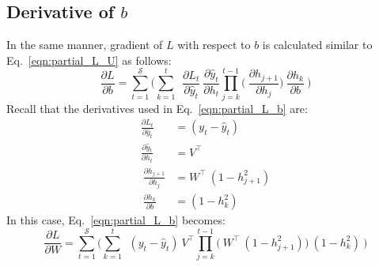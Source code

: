 \documentclass{article}
\begin{document}
\subsection{Derivative of $b$}
In the same manner, gradient of $L$ with respect to $b$ is calculated similar to Eq.~\eqref{eqn:partial_L_U} as follows:
\begin{equation}
	\frac{\partial L}{ \partial{b}} = \sum_{t=1}^{\mathcal{S}} 
	\bigg(	
	 \sum_{k=1}^{t} ~
	~\frac{\partial L_t}{\partial \hat{y}_t}
	~\frac{\partial \hat{y}_t}{\partial h_t}
        \prod_{j=k}^{t-1} \bigg(
	~\frac{\partial h_{j+1}}{\partial h_{j}}
        \bigg)
	~\frac{\partial h_k}{\partial b}~
	\bigg) 
 \label{eqn:partial_L_b}
\end{equation}
Recall that the derivatives used in Eq.~\eqref{eqn:partial_L_b} are:
\begin{align*}
        \frac{\partial L_t}{\partial \hat{y}_t} &= (y_t - \hat{y}_t)\\
        \frac{\partial \hat{y}_t}{\partial h_t}
        &= V^\top \\
        ~\frac{\partial h_{j+1}}{\partial h_{j}}
        &= W^\top ~ (1 - h_{j+1}^2) \\
        ~\frac{\partial h_k}{\partial b}&= (1-h_k^2)
\end{align*}
In this case, Eq.~\eqref{eqn:partial_L_b} becomes:
\begin{equation}
	\frac{\partial L}{ \partial{W}} = \sum_{t=1}^{\mathcal{S}} 
	\bigg(	
	 \sum_{k=1}^{t} ~
	~(y_t - \hat{y}_t)
	~V^\top
        \prod_{j=k}^{t-1} \bigg(
	~W^\top ~ (1 - h_{j+1}^2)
        \bigg)
	~(1-h_k^2)~
	\bigg) 
 \label{eqn:partial_L_ab}
\end{equation}
\end{document}
